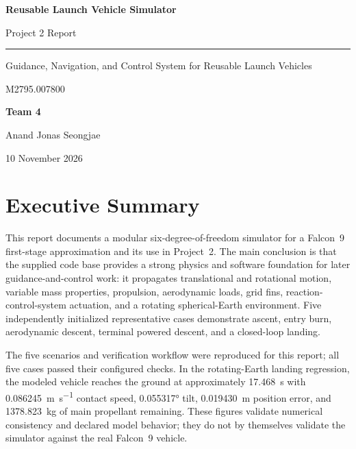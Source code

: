 \documentclass[11pt,letterpaper]{article}
\begin{document}
\hypersetup{pageanchor=false}

\begin{titlepage}
  \centering
  \vspace*{1.7in}
  {\LARGE\bfseries Reusable Launch Vehicle Simulator\par}
  \vspace{0.16in}
  {\Large Project 2 Report\par}
  \vspace{0.3in}
  \rule{0.58\textwidth}{0.5pt}\par
  \vspace{0.3in}
  {\large Guidance, Navigation, and Control System for Reusable Launch Vehicles\par}
  \vspace{0.1in}
  {\large M2795.007800\par}
  \vfill
  {\large\textbf{Team 4}\par}
  \vspace{0.16in}
  {\large Anand \quad Jonas \quad Seongjae\par}
  \vspace{0.32in}
  {\large 10 November 2026\par}
  \vfill
\end{titlepage}

\hypersetup{pageanchor=true}
\tableofcontents
\clearpage
{}

\section*{Executive Summary}

This report documents a modular six-degree-of-freedom simulator for a Falcon~9 first-stage approximation and its use in Project~2. The main conclusion is that the supplied code base provides a strong physics and software foundation for later guidance-and-control work: it propagates translational and rotational motion, variable mass properties, propulsion, aerodynamic loads, grid fins, reaction-control-system actuation, and a rotating spherical-Earth environment. Five independently initialized representative cases demonstrate ascent, entry burn, aerodynamic descent, terminal powered descent, and a closed-loop landing.

The five scenarios and verification workflow were reproduced for this report; all five cases passed their configured checks. In the rotating-Earth landing regression, the modeled vehicle reaches the ground at approximately \SI{17.468}{\second} with \SI{0.086245}{\metre\per\second} contact speed, \ang{0.055317} tilt, \SI{0.019430}{\metre} position error, and \SI{1378.823}{\kilogram} of main propellant remaining. These figures validate numerical consistency and declared model behavior; they do not by themselves validate the simulator against the real Falcon~9 vehicle.
\end{document}
